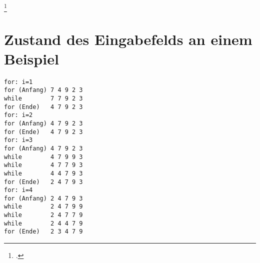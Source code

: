\documentclass{lehramt-informatik-haupt}
\begin{document}
\footcite[Seite 125 - 127]{saake}

\section{Zustand des Eingabefelds an einem Beispiel}

\begin{verbatim}
for: i=1
for (Anfang) 7 4 9 2 3
while        7 7 9 2 3
for (Ende)   4 7 9 2 3
for: i=2
for (Anfang) 4 7 9 2 3
for (Ende)   4 7 9 2 3
for: i=3
for (Anfang) 4 7 9 2 3
while        4 7 9 9 3
while        4 7 7 9 3
while        4 4 7 9 3
for (Ende)   2 4 7 9 3
for: i=4
for (Anfang) 2 4 7 9 3
while        2 4 7 9 9
while        2 4 7 7 9
while        2 4 4 7 9
for (Ende)   2 3 4 7 9
\end{verbatim}



\literatur
\end{document}
